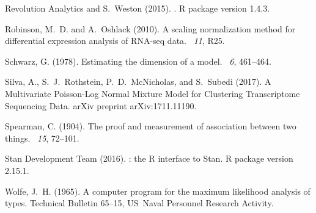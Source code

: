 \documentclass[12pt]{article}
\begin{document}
{\begin{thebibliography}{}
{Revolution Analytics} and S.~Weston (2015).
.
\newblock R package version 1.4.3.

Robinson, M.~D. and A.~Oshlack (2010).
\newblock A scaling normalization method for differential expression analysis
  of {RNA}-seq data.
~{\em 11\/}, R25.

Schwarz, G. (1978).
\newblock Estimating the dimension of a model.
~{\em 6}, 461--464.

Silva, A., S.~J.~Rothstein, P.~D.~McNicholas, and S.~Subedi (2017).
\newblock A Multivariate {P}oisson-Log Normal Mixture Model for Clustering Transcriptome Sequencing Data.
\newblock arXiv preprint arXiv:1711.11190.

Spearman, C. (1904).
\newblock The proof and measurement of association between two things.
~{\em 15}, 72--101.

{Stan Development Team} (2016).
: the {R} interface to {Stan}.
\newblock R package version 2.15.1.

Wolfe, J.~H. (1965).
\newblock A computer program for the maximum likelihood analysis of types.
\newblock Technical Bulletin 65--15, US\ Naval Personnel Research Activity.



\end{thebibliography}
}
\end{document}
